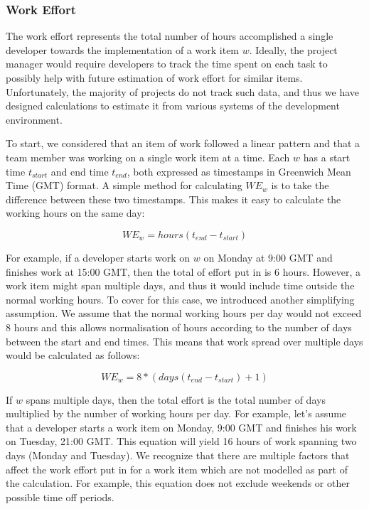 \documentclass{mpaper}
\begin{document}
\subsubsection*{Work Effort}
\label{work-effort}

The work effort represents the total number of hours accomplished a single
developer towards the implementation of a work item $w$. Ideally, the project
manager would require developers to track the time spent on each task to
possibly help with future estimation of work effort for similar items.
Unfortunately, the majority of projects do not track such data, and thus we have
designed calculations to estimate it from various systems of the development
environment.

To start, we considered that an item of work followed a linear pattern and that
a team member was working on a single work item at a time. Each $w$ has a start
time $t_{start}$ and end time $t_{end}$, both expressed as timestamps in
Greenwich Mean Time (GMT) format. A simple method for calculating $WE_{w}$ is to
take the difference between these two timestamps. This makes it easy to
calculate the working hours on the same day:

\begin{equation}
  \label{eq-work-effort-simple}
  WE_{w} = hours(t_{end} - t_{start})
\end{equation}

For example, if a developer starts work on $w$ on Monday at 9:00 GMT and
finishes work at 15:00 GMT, then the total of effort put in is 6 hours. However,
a work item might span multiple days, and thus it would include time outside the
normal working hours. To cover for this case, we introduced another simplifying
assumption. We assume that the normal working hours per day would not exceed 8
hours and this allows normalisation of hours according to the number of days
between the start and end times. This means that work spread over multiple days
would be calculated as follows:

\begin{equation}
  \label{eq-work-effort-days}
  WE_{w} = 8 * (days(t_{end} - t_{start}) + 1)
\end{equation}

If $w$ spans multiple days, then the total effort is the total number of
days multiplied by the number of working hours per day. For example, let's
assume that a developer starts a work item on Monday, 9:00 GMT and finishes his
work on Tuesday, 21:00 GMT. This equation will yield 16 hours of work spanning
two days (Monday and Tuesday). We recognize that there are multiple factors that
affect the work effort put in for a work item which are not modelled as part of
the calculation. For example, this equation does not exclude weekends or other
possible time off periods. 
\end{document}
